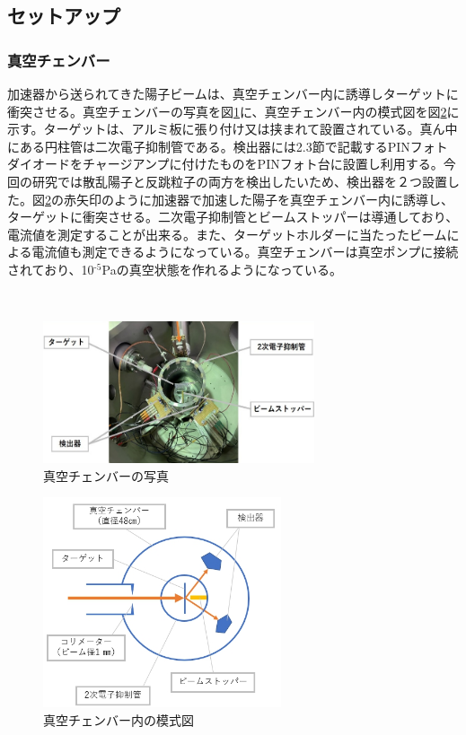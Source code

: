 \documentclass[a4paper,11pt,dvipdfmx]{jsarticle}
\begin{document}
\subsection{セットアップ}


\subsubsection{真空チェンバー}
加速器から送られてきた陽子ビームは、真空チェンバー内に誘導しターゲットに衝突させる。真空チェンバーの写真を図\ref{chanber}に、真空チェンバー内の模式図を図\ref{chanbermoshi}に示す。ターゲットは、アルミ板に張り付け又は挟まれて設置されている。真ん中にある円柱管は二次電子抑制管である。検出器には2.3節で記載するPINフォトダイオードをチャージアンプに付けたものをPINフォト台に設置し利用する。今回の研究では散乱陽子と反跳粒子の両方を検出したいため、検出器を２つ設置した。図\ref{chanbermoshi}の赤矢印のように加速器で加速した陽子を真空チェンバー内に誘導し、ターゲットに衝突させる。二次電子抑制管とビームストッパーは導通しており、電流値を測定することが出来る。また、ターゲットホルダーに当たったビームによる電流値も測定できるようになっている。真空チェンバーは真空ポンプに接続されており、10$^\text{-5}$Paの真空状態を作れるようになっている。
　
 
 　\begin{figure}[H]
    \centering
    \includegraphics[width=80mm]{picture/setup/chanber.png}
    \caption{真空チェンバーの写真}
    \label{chanber}
  \end{figure}
  
  \begin{figure}[H]
    \centering
    \includegraphics[width=70mm]{picture/setup/chanbermoshi.jpg}
    \caption{真空チェンバー内の模式図}
    \label{chanbermoshi}
  \end{figure}
  
\end{document}
